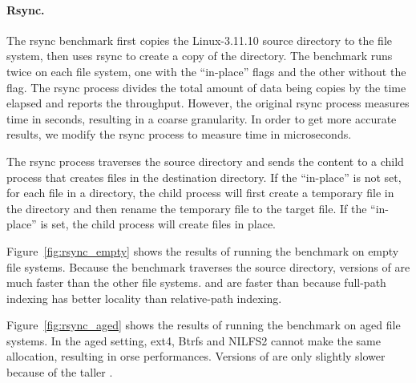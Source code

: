 \paragraph{Rsync.}

The rsync benchmark first copies the Linux-3.11.10 source directory to the file
system, then uses rsync to create a copy of the directory.
The benchmark runs twice on each file system, one with the ``in-place'' flags
and the other without the flag.
The rsync process divides the total amount of data being copies by the time
elapsed and reports the throughput.
However, the original rsync process measures time in seconds,
resulting in a coarse granularity.
In order to get more accurate results, we modify the rsync process to
measure time in microseconds.

The rsync process traverses the source directory and sends the content to
a child process that creates files in the destination directory.
If the ``in-place'' is not set, for each file in a directory,
the child process will first create a temporary file in the directory and
then rename the temporary file to the target file.
If the ``in-place'' is set, the child process will create files in place.

Figure~\ref{fig:rsync_empty} shows the results of running the benchmark on empty
file systems.
Because the benchmark traverses the source directory,
versions of \betrfs are much faster than the other file systems.
\betrfsFour and \betrfsFive are faster than \betrfsThree because full-path
indexing has better locality than relative-path indexing.

Figure~\ref{fig:rsync_aged} shows the results of running the benchmark on
aged file systems.
In the aged setting, ext4, Btrfs and NILFS2 cannot make the same allocation,
resulting in orse performances.
Versions of \betrfs are only slightly slower because of the taller \bets.


